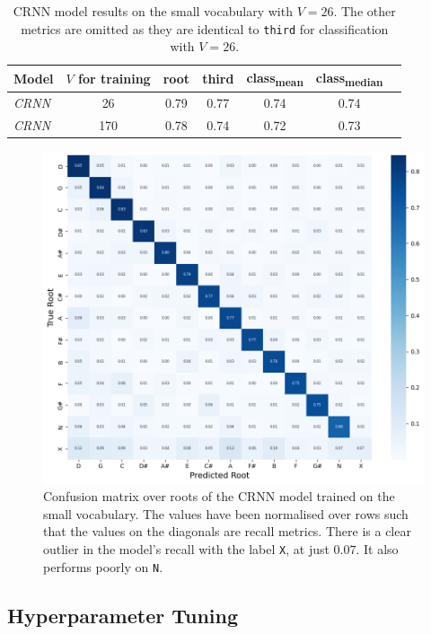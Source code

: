 \begin{table}[H]
    \centering
    \begin{tabular}{lcccccc}
        \toprule
        Model & $V$ for training & root & third & class\textsubscript{mean} & class\textsubscript{median} \\  
        \midrule
        \emph{CRNN} & 26 & 0.79 & 0.77 & 0.74 & 0.74 \\
        \emph{CRNN} & 170 & 0.78 & 0.74 & 0.72 & 0.73 \\
        \bottomrule
    \end{tabular}
    \caption{CRNN model results on the small vocabulary with $V=26$. The other metrics are omitted as they are identical to \texttt{third} for classification with $V=26$.}\label{tab:crnn_small_vocab}
\end{table}

\begin{figure}[H]
    \centering
    \includegraphics[width=1.0\textwidth]{figures/small_vocab_root_cm.png}
    \caption{Confusion matrix over roots of the CRNN model trained on the small vocabulary. The values have been normalised over rows such that the values on the diagonals are recall metrics. There is a clear outlier in the model's recall with the label \texttt{X}, at just $0.07$. It also performs poorly on \texttt{N}.}\label{fig:crnn_small_vocab_cm}
\end{figure}

\subsection{Hyperparameter Tuning}


